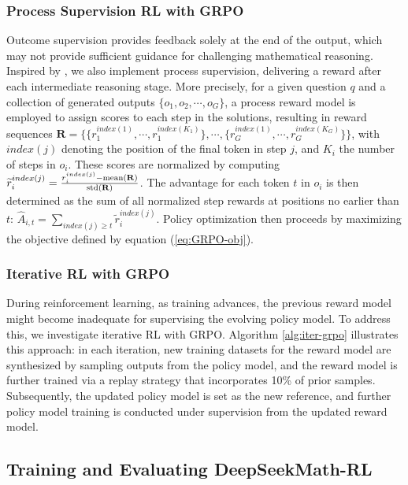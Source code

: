 \subsubsection{Process Supervision RL with GRPO} Outcome supervision provides feedback solely at the end of the output, which may not provide sufficient guidance for challenging mathematical reasoning. Inspired by \cite{wang2023math}, we also implement process supervision, delivering a reward after each intermediate reasoning stage. More precisely, for a given question $q$ and a collection of generated outputs $\{o_1, o_2, \cdots, o_G\}$, a process reward model is employed to assign scores to each step in the solutions, resulting in reward sequences $\mathbf{R} = \{ \{r_1^{index(1)},\cdots,r_1^{index(K_1)}\}, \cdots,  \{r_G^{index(1)},\cdots,r_G^{index(K_G)}\} \}$, with $index(j)$ denoting the position of the final token in step $j$, and $K_i$ the number of steps in $o_i$. These scores are normalized by computing $\widetilde{r}_i^{index(j)} = \frac{r_i^{index(j)} - {\rm mean(\mathbf{R})}}{{\rm std(\mathbf{R})}}$. The advantage for each token $t$ in $o_i$ is then determined as the sum of all normalized step rewards at positions no earlier than $t$: $\hat{A}_{i, t} = \sum_{index(j) \ge t} \widetilde{r}_i^{index(j)}$. Policy optimization then proceeds by maximizing the objective defined by equation (\ref{eq:GRPO-obj}).

\subsubsection{Iterative RL with GRPO} During reinforcement learning, as training advances, the previous reward model might become inadequate for supervising the evolving policy model. To address this, we investigate iterative RL with GRPO. Algorithm \ref{alg:iter-grpo} illustrates this approach: in each iteration, new training datasets for the reward model are synthesized by sampling outputs from the policy model, and the reward model is further trained via a replay strategy that incorporates 10\% of prior samples. Subsequently, the updated policy model is set as the new reference, and further policy model training is conducted under supervision from the updated reward model.

\subsection{Training and Evaluating DeepSeekMath-RL}

